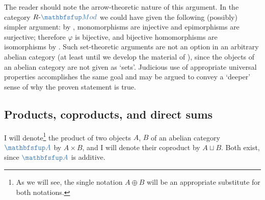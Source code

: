 The reader should note the arrow-theoretic nature of this argument. In
the category $R\text{-}\categ{Mod}$ we could have given the following
(possibly) simpler argument: by ,
monomorphisms are injective and epimorphisms are surjective; therefore
$\varphi$ is bijective, and bijective homomorphisms are isomorphisms
by . Such set-theoretic arguments are
not an option in an arbitrary abelian category (at least until we
develop the material of
), since the objects
of an abelian category are not given as `sets'. Judicious use of
appropriate universal properties accomplishes the same goal and may be
argued to convey a `deeper' sense of why the proven statement is true.

\subsection{Products, coproducts, and direct sums}
\label{subsec:homol:products-coproducts-and-direct-sums}
I will denote\footnote{As we will see, the single notation
  $A \oplus B$ will be an appropriate substitute for both notations.}
the product of two objects $A$, $B$ of an abelian category $\categ{A}$
by $A \times B$, and I will denote their coproduct by $A \sqcup
B$. Both exist, since $\categ{A}$ is additive.

